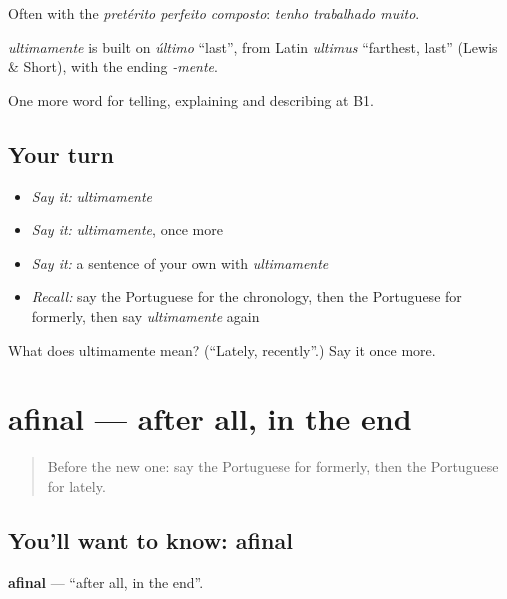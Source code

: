 Often with the \emph{pretérito perfeito composto}: \emph{tenho trabalhado muito}.

\begin{cousinweb}
\emph{ultimamente} is built on \emph{último} \textquotedblleft{}last\textquotedblright{}, from Latin \emph{ultimus} \textquotedblleft{}farthest, last\textquotedblright{} (Lewis \& Short), with the ending \emph{-mente}.
\end{cousinweb}

\begin{grammarlens}[title={What you've built}]
One more word for telling, explaining and describing at B1.
\end{grammarlens}

\subsection*{Your turn}
\begin{itemize}
\raggedright
  \item \emph{Say it:} \emph{ultimamente}
  \item \emph{Say it:} \emph{ultimamente}, once more
  \item \emph{Say it:} a sentence of your own with \emph{ultimamente}
  \item \emph{Recall:} say the Portuguese for the chronology, then the Portuguese for formerly, then say \emph{ultimamente} again
\end{itemize}

\begin{tcolorbox}[breakable,colback=teal!4,colframe=teal!35!black,title={Before you move on}]
What does ultimamente mean? (\textquotedblleft{}Lately, recently\textquotedblright{}.) Say it once more.
\end{tcolorbox}
\section[afinal]{afinal — after all, in the end}

\label{lesson:PT-C274-afinal}



\begin{quote}
Before the new one: say the Portuguese for formerly, then the Portuguese for lately.
\end{quote}

\subsection*{You'll want to know: afinal}
\textbf{afinal} — \textquotedblleft{}after all, in the end\textquotedblright{}.

